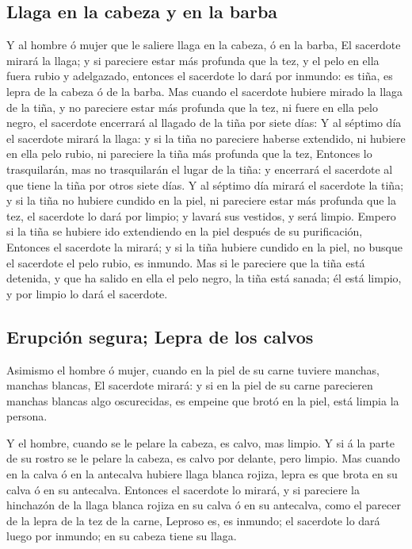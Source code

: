 \hypertarget{llaga-en-la-cabeza-y-en-la-barba}{%
\subsection{Llaga en la cabeza y en la
barba}\label{llaga-en-la-cabeza-y-en-la-barba}}

 Y al hombre ó mujer que le saliere llaga en la cabeza, ó
en la barba,  El sacerdote mirará la llaga; y si
pareciere estar más profunda que la tez, y el pelo en ella fuera rubio y
adelgazado, entonces el sacerdote lo dará por inmundo: es tiña, es lepra
de la cabeza ó de la barba.  Mas cuando el sacerdote
hubiere mirado la llaga de la tiña, y no pareciere estar más profunda
que la tez, ni fuere en ella pelo negro, el sacerdote encerrará al
llagado de la tiña por siete días:  Y al séptimo día el
sacerdote mirará la llaga: y si la tiña no pareciere haberse extendido,
ni hubiere en ella pelo rubio, ni pareciere la tiña más profunda que la
tez,  Entonces lo trasquilarán, mas no trasquilarán el
lugar de la tiña: y encerrará el sacerdote al que tiene la tiña por
otros siete días.  Y al séptimo día mirará el sacerdote
la tiña; y si la tiña no hubiere cundido en la piel, ni pareciere estar
más profunda que la tez, el sacerdote lo dará por limpio; y lavará sus
vestidos, y será limpio.  Empero si la tiña se hubiere
ido extendiendo en la piel después de su purificación, 
Entonces el sacerdote la mirará; y si la tiña hubiere cundido en la
piel, no busque el sacerdote el pelo rubio, es inmundo. 
Mas si le pareciere que la tiña está detenida, y que ha salido en ella
el pelo negro, la tiña está sanada; él está limpio, y por limpio lo dará
el sacerdote.

\hypertarget{erupciuxf3n-segura-lepra-de-los-calvos}{%
\subsection{Erupción segura; Lepra de los
calvos}\label{erupciuxf3n-segura-lepra-de-los-calvos}}

 Asimismo el hombre ó mujer, cuando en la piel de su
carne tuviere manchas, manchas blancas,  El sacerdote
mirará: y si en la piel de su carne parecieren manchas blancas algo
oscurecidas, es empeine que brotó en la piel, está limpia la persona.

 Y el hombre, cuando se le pelare la cabeza, es calvo,
mas limpio.  Y si á la parte de su rostro se le pelare la
cabeza, es calvo por delante, pero limpio.  Mas cuando en
la calva ó en la antecalva hubiere llaga blanca rojiza, lepra es que
brota en su calva ó en su antecalva.  Entonces el
sacerdote lo mirará, y si pareciere la hinchazón de la llaga blanca
rojiza en su calva ó en su antecalva, como el parecer de la lepra de la
tez de la carne,  Leproso es, es inmundo; el sacerdote lo
dará luego por inmundo; en su cabeza tiene su llaga.


